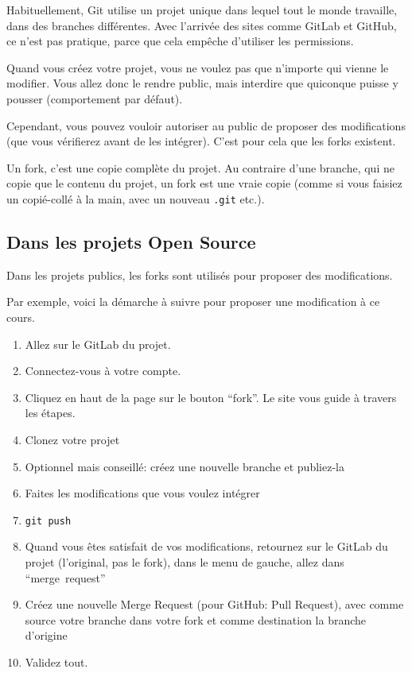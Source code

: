 \documentclass[10pt,a4paper]{article}
\begin{document}
Habituellement, Git utilise un projet unique dans lequel tout le monde travaille, dans des branches différentes. Avec l'arrivée des sites comme GitLab et GitHub, ce n'est pas pratique, parce que cela empêche d'utiliser les permissions.

Quand vous créez votre projet, vous ne voulez pas que n'importe qui vienne le modifier. Vous allez donc le rendre public, mais interdire que quiconque puisse y pousser (comportement par défaut).

Cependant, vous pouvez vouloir autoriser au public de proposer des modifications (que vous vérifierez avant de les intégrer). C'est pour cela que les forks existent.

Un fork, c'est une copie complète du projet. Au contraire d'une branche, qui ne copie que le contenu du projet, un fork est une vraie copie (comme si vous faisiez un copié-collé à la main, avec un nouveau {\tt .git} etc.).

\subsection{Dans les projets Open Source}

Dans les projets publics, les forks sont utilisés pour proposer des modifications.

Par exemple, voici la démarche à suivre pour proposer une modification à ce cours.

\begin{enumerate}
\item Allez sur le GitLab du projet.
\item Connectez-vous à votre compte.
\item Cliquez en haut de la page sur le bouton ``fork''. Le site vous guide à travers les étapes.
\item Clonez votre projet
\item Optionnel mais conseillé: créez une nouvelle branche et publiez-la
\item Faites les modifications que vous voulez intégrer
\item {\tt git push}
\item Quand vous êtes satisfait de vos modifications, retournez sur le GitLab du projet (l'original, pas le fork), dans le menu de gauche, allez dans ``merge~request''
\item Créez une nouvelle Merge Request (pour GitHub: Pull Request), avec comme source votre branche dans votre fork et comme destination la branche d'origine
\item Validez tout.
\end{enumerate}
\end{document}
